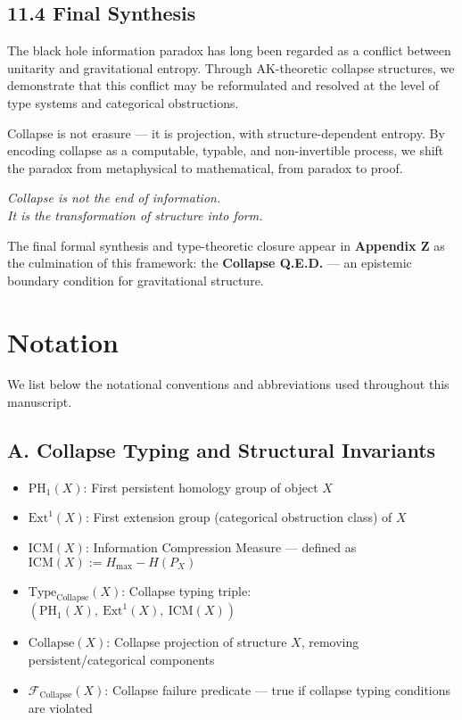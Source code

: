 \documentclass[11pt]{article}
\begin{document}
\subsection*{11.4 Final Synthesis}

The black hole information paradox has long been regarded as a conflict between unitarity and gravitational entropy. Through AK-theoretic collapse structures, we demonstrate that this conflict may be reformulated and resolved at the level of type systems and categorical obstructions.

Collapse is not erasure — it is projection, with structure-dependent entropy.  
By encoding collapse as a computable, typable, and non-invertible process, we shift the paradox from metaphysical to mathematical, from paradox to proof.

\begin{center}
\textit{Collapse is not the end of information.} \\
\textit{It is the transformation of structure into form.}
\end{center}

\vspace{1em}

The final formal synthesis and type-theoretic closure appear in \textbf{Appendix Z} as the culmination of this framework:  
the \textbf{Collapse Q.E.D.} — an epistemic boundary condition for gravitational structure.



\section*{Notation}

We list below the notational conventions and abbreviations used throughout this manuscript.

\subsection*{A. Collapse Typing and Structural Invariants}

\begin{itemize}
  \item \( \mathrm{PH}_1(X) \): First persistent homology group of object \( X \)
  \item \( \mathrm{Ext}^1(X) \): First extension group (categorical obstruction class) of \( X \)
  \item \( \mathrm{ICM}(X) \): Information Compression Measure — defined as \( \mathrm{ICM}(X) := H_{\max} - H(P_X) \)
  \item \( \mathrm{Type}_{\mathrm{Collapse}}(X) \): Collapse typing triple: \( (\mathrm{PH}_1(X),\ \mathrm{Ext}^1(X),\ \mathrm{ICM}(X)) \)
  \item \( \mathrm{Collapse}(X) \): Collapse projection of structure \( X \), removing persistent/categorical components
  \item \( \mathcal{F}_{\mathrm{Collapse}}(X) \): Collapse failure predicate — true if collapse typing conditions are violated
\end{itemize}
\end{document}

